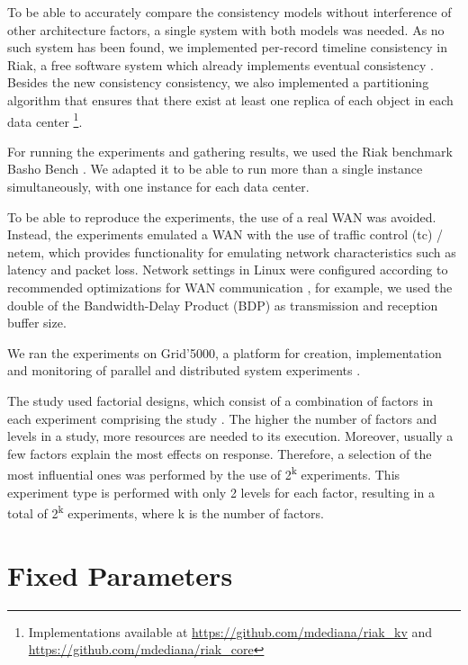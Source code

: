 \documentclass[doublespacing]{bmcart}
\begin{document}
To be able to accurately compare the consistency models without interference of other architecture factors, a single system with both models was needed. As no such system has been found, we implemented per-record timeline consistency
in Riak, a free software system which already implements eventual consistency
\cite{Riak2013}. Besides the new consistency consistency, we also implemented a
partitioning algorithm that ensures that there exist at least one replica of
each object in each data center \footnote{Implementations available at
\url{https://github.com/mdediana/riak_kv} and
\url{https://github.com/mdediana/riak_core}}.

For running the experiments and gathering results, we used the Riak benchmark Basho Bench \cite{BashoBench2013}. We adapted it to be able to run more than a single instance simultaneously, with one instance for each data center.

To be able to reproduce the experiments, the use of a real WAN was avoided. Instead, the experiments emulated a WAN with the use of traffic control (tc) / netem, which provides
functionality for emulating network characteristics such as latency and packet
loss. Network settings in Linux were configured according to
recommended optimizations for WAN communication \cite{ESnet2012}, for example,
we used the double of the Bandwidth-Delay Product (BDP) as transmission and
reception buffer size.

We ran the experiments on Grid'5000, a platform for creation, implementation
and monitoring of parallel and distributed system experiments
\cite{Grid50002013}.

The study used factorial designs, which consist of a combination of factors in
each experiment comprising the study \cite{Jain1991}. The higher the number of
factors and levels in a study, more resources are needed to its execution.
Moreover, usually a few factors explain the most effects on response. Therefore,
a selection of the most influential ones was performed by the use of
2\textsuperscript{k} experiments. This experiment type is performed with only 2
levels for each factor, resulting in a total of 2\textsuperscript{k} experiments, where k is
the number of factors.

\section{Fixed Parameters}
\end{document}
